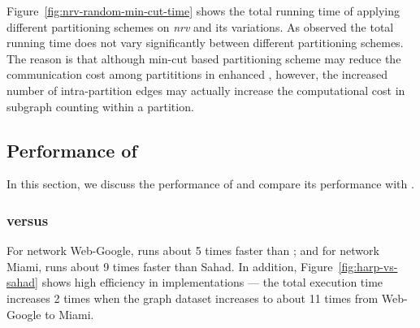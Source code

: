 Figure~\ref{fig:nrv-random-min-cut-time} shows the total running time of
applying different partitioning schemes on \textit{nrv} and its variations. As
observed the total running time does not vary significantly between different
partitioning schemes. The reason is that although min-cut based partitioning
scheme may reduce the communication cost among partititions in enhanced
\sahad{}, however, the increased number of intra-partition edges may
actually increase the computational cost in subgraph counting within a
partition. 

\fi

\subsection{Performance of \harpsahad{}}
\label{sec:exp:harp}
In this section, we discuss the performance of \harpsahad{} and compare its performance
with \sahad{}. 

\subsubsection{\harpsahad{} versus \sahad{}} 
For network Web-Google, \harpsahad{} runs about 5 times faster than \sahad{}; and for
network Miami, \harpsahad{} runs about 9 times faster than Sahad. In addition,
Figure~\ref{fig:harp-vs-sahad} shows high efficiency in implementations — the
total execution time increases 2 times when the graph dataset increases to
about 11 times from Web-Google to Miami. 


